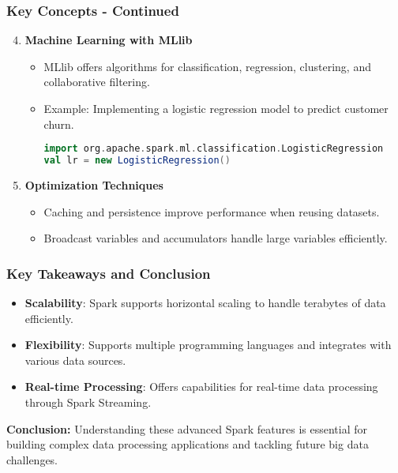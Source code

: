 \documentclass[aspectratio=169]{beamer}
\begin{document}
\begin{frame}[fragile]
    \frametitle{Key Concepts - Continued}
    \begin{enumerate}
        \setcounter{enumi}{3} %
        \item \textbf{Machine Learning with MLlib}
        \begin{itemize}
            \item MLlib offers algorithms for classification, regression, clustering, and collaborative filtering.
            \item Example: Implementing a logistic regression model to predict customer churn.
            \begin{lstlisting}[language=scala]
import org.apache.spark.ml.classification.LogisticRegression
val lr = new LogisticRegression()
            \end{lstlisting}
        \end{itemize}

        \item \textbf{Optimization Techniques}
        \begin{itemize}
            \item Caching and persistence improve performance when reusing datasets.
            \item Broadcast variables and accumulators handle large variables efficiently.
        \end{itemize}
    \end{enumerate}
\end{frame}

\begin{frame}[fragile]
    \frametitle{Key Takeaways and Conclusion}
    \begin{itemize}
        \item \textbf{Scalability}: Spark supports horizontal scaling to handle terabytes of data efficiently.
        \item \textbf{Flexibility}: Supports multiple programming languages and integrates with various data sources.
        \item \textbf{Real-time Processing}: Offers capabilities for real-time data processing through Spark Streaming.
    \end{itemize}
    
    \textbf{Conclusion:} Understanding these advanced Spark features is essential for building complex data processing applications and tackling future big data challenges.
\end{frame}
\end{document}

